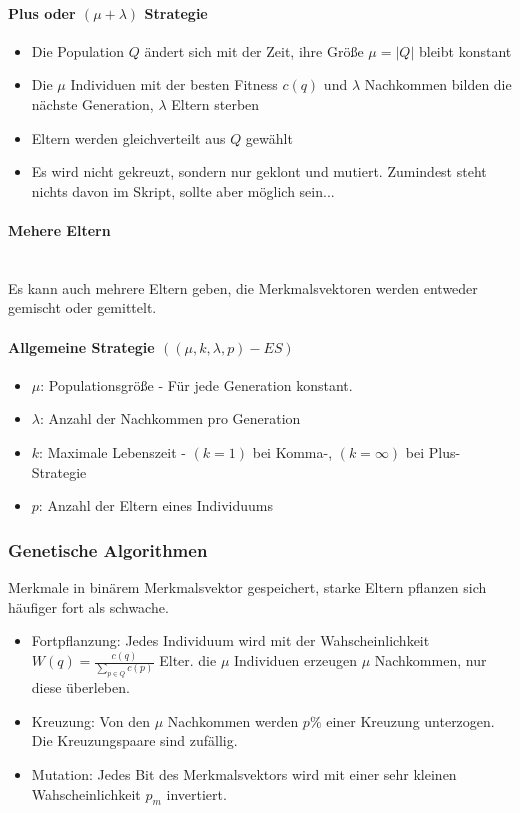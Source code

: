 \paragraph{Plus oder $(\mu + \lambda)$ Strategie}
\begin{itemize}
	\item Die Population \(Q\) ändert sich mit der Zeit, ihre Größe \(\mu = |Q|\) bleibt konstant
	\item Die \(\mu\) Individuen mit der besten Fitness \(c(q)\) und \(\lambda\) Nachkommen bilden die nächste Generation, \(\lambda\) Eltern sterben
	\item Eltern werden gleichverteilt aus \(Q\) gewählt
	\item Es wird nicht gekreuzt, sondern nur geklont und mutiert. Zumindest steht nichts davon im Skript, sollte aber möglich sein...
\end{itemize}

\paragraph{Mehere Eltern}
\text{ }\\Es kann auch mehrere Eltern geben, die Merkmalsvektoren werden entweder gemischt oder gemittelt.


\paragraph{Allgemeine Strategie $((\mu, k, \lambda, p) - ES)$}
\begin{itemize}
	\item \(\mu\): Populationsgröße - Für jede Generation konstant.
	\item \(\lambda\): Anzahl der Nachkommen pro Generation
	\item \(k\): Maximale Lebenszeit - \((k = 1)\) bei Komma-, \((k=\infty)\) bei Plus-Strategie
	\item \(p\): Anzahl der Eltern eines Individuums
\end{itemize}

\subsubsection{Genetische Algorithmen}
Merkmale in binärem Merkmalsvektor gespeichert, starke Eltern pflanzen sich häufiger fort als schwache.

\begin{itemize}
	\item Fortpflanzung: Jedes Individuum wird mit der Wahscheinlichkeit \(W(q) = \frac{c(q)}{\sum\limits_{p \in Q}c(p)}\) Elter. die \(\mu\) Individuen erzeugen \(\mu\) Nachkommen, nur diese überleben.
	\item Kreuzung: Von den \(\mu\) Nachkommen werden \(p\%\) einer Kreuzung unterzogen. Die Kreuzungspaare sind zufällig.
	\item Mutation: Jedes Bit des Merkmalsvektors wird mit einer sehr kleinen Wahscheinlichkeit \(p_m\) invertiert.
\end{itemize}

